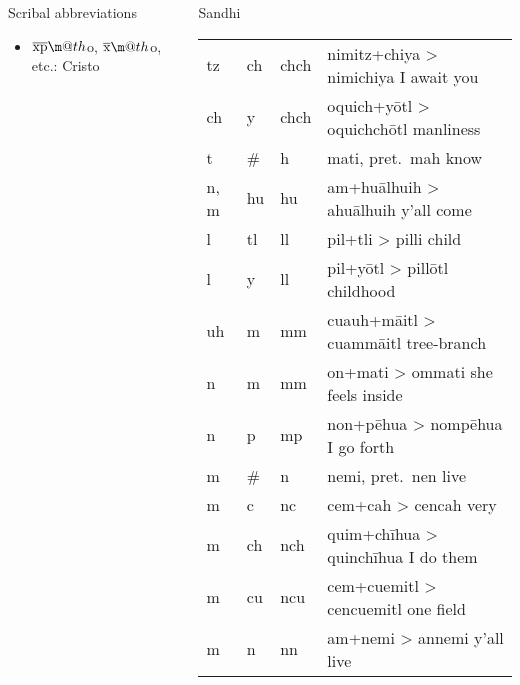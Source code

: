 \documentclass[12pt]{beamer}
\makeatletter
\newcommand*{\textoverline}[1]{$\overline{\hbox{#1}}\m@th$}
\newcommand{\nah}[1]{\textcolor{nahgrn}{#1}}
\newcommand{\trs}[1]{\textcolor{nahblu}{#1}}
\makeatother
\begin{document}
\begin{frame}
\begin{columns}[t]
\begin{column}{.22\linewidth}
\begin{block}{Scribal abbreviations}
\begin{multicols}{2}
\begin{itemize}
          \item \nah{\textoverline{xp}o, \textoverline{x}o}, etc.: \nah{Cristo}
          \end{itemize}
        \end{multicols}
      \end{block}
    \end{column}
    \begin{column}{.25\linewidth}
      \begin{block}{Sandhi}
        \begin{threeparttable}
          \begin{tabular}{l@{+}l@{>}ll}
            \nah{tz} & \nah{ch} & \nah{chch}\tnote{1} & \nah{nimitz}+\nah{chiya} > \nah{nimichiya} \trs{I await you} \\
            \nah{ch} & \nah{y} & \nah{chch}\tnote{1} & \nah{oquich}+\nah{yōtl} > \nah{oquichchōtl} \trs{manliness} \\
            \nah{t} & \nah{\#} & \nah{h} & \nah{mati}, pret.~\nah{mah} \trs{know} \\
            \nah{n, m} & \nah{hu} & \nah{hu} & \nah{am}+\nah{huālhuih} > \nah{ahuālhuih} \trs{y'all come} \\
            \nah{l} & \nah{tl} & \nah{ll} & \nah{pil}+\nah{tli} > \nah{pilli} \trs{child} \\
            \nah{l} & \nah{y} & \nah{ll} & \nah{pil}+\nah{yōtl} > \nah{pillōtl} \trs{childhood} \\
            \nah{uh} & \nah{m} & \nah{mm} & \nah{cuauh}+\nah{māitl} > \nah{cuammāitl} \trs{tree-branch} \\
            \nah{n} & \nah{m} & \nah{mm} & \nah{on}+\nah{mati} > \nah{ommati} \trs{she feels inside} \\
            \nah{n} & \nah{p} & \nah{mp} & \nah{non}+\nah{pēhua} > \nah{nompēhua} \trs{I go forth} \\
            \nah{m} & \nah{\#} & \nah{n} & \nah{nemi}, pret.~\nah{nen} \trs{live} \\
            \nah{m} & \nah{c} & \nah{nc} & \nah{cem}+\nah{cah} > \nah{cencah} \trs{very} \\
            \nah{m} & \nah{ch} & \nah{nch} & \nah{quim}+\nah{chīhua} > \nah{quinchīhua} \trs{I do them} \\
            \nah{m} & \nah{cu} & \nah{ncu} & \nah{cem}+\nah{cuemitl} > \nah{cencuemitl} \trs{one field} \\
            \nah{m} & \nah{n} & \nah{nn} & \nah{am}+\nah{nemi} > \nah{annemi} \trs{y'all live} \\

\end{tabular}
\end{threeparttable}
\end{block}
\end{column}
\end{columns}
\end{frame}
\end{document}
